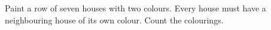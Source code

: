 Paint a row of seven houses with two colours. Every house must have a neighbouring house of its own colour. Count the colourings.
